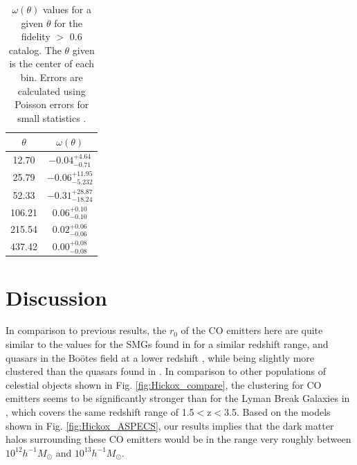 \begin{table}[!htp]
\caption{$\omega(\theta)$ values for a given $\theta$ for the fidelity $>$ 0.6 catalog. The $\theta$ given is the center of each bin. Errors are calculated using Poisson errors for small statistics \cite{1986ApJ...303..336G}.}
\centering
\begin{tabular}{cc}\label{table:Angular_binnings}
$\theta$ & $\omega(\theta)$          \\
\hline
12.70    & $-0.04_{-0.71}^{+4.64}$   \\
25.79    & $-0.06_{-5.232}^{+11.95}$ \\
52.33    & $-0.31_{-18.24}^{+28.87}$ \\
106.21   & $0.06_{-0.10}^{+0.10}$    \\
215.54   & $0.02_{-0.06}^{+0.06}$    \\
437.42   & $0.00_{-0.08}^{+0.08}$   
\end{tabular}
\end{table}

\section{Discussion}\label{sec:Clust_Disc}

In comparison to previous results, the $r_0$ of the CO emitters here are quite similar to the values for the SMGs found in \cite{10.1111/j.1365-2966.2011.20303.x} for a similar redshift range, and quasars in the Bo\"otes field at a lower redshift \cite{hickox2011clustering}, while being slightly more clustered than the quasars found in \cite{ross2009clustering}. In comparison to other populations of celestial objects shown in Fig. \ref{fig:Hickox_compare}, the clustering for CO emitters seems to be significantly stronger than for the Lyman Break Galaxies in \cite{adelberger2005spatial}, which covers the same redshift range of 1.5$<$z$<$3.5. Based on the models shown in Fig. \ref{fig:Hickox_ASPECS}, our results implies that the dark matter halos surrounding these CO emitters would be in the range very roughly between $10^{12} h^{-1}M_{\odot}$ and $10^{13} h^{-1}M_{\odot}$.

